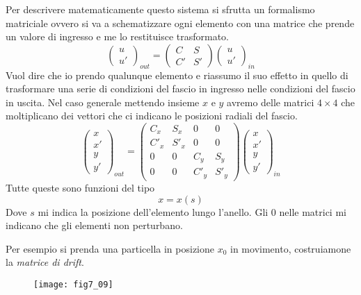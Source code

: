 Per descrivere matematicamente questo sistema si sfrutta un formalismo matriciale ovvero si va a schematizzare ogni elemento con una matrice che prende un valore di ingresso e me lo restituisce trasformato.
\begin{equation}
\begin{pmatrix}
u\\
u'
\end{pmatrix}_{out}
=
\begin{pmatrix}
C & S\\
C' & S'
\end{pmatrix}
\begin{pmatrix}
u\\
u'
\end{pmatrix}_{in}
\end{equation}
Vuol dire che io prendo qualunque elemento e riassumo il suo  effetto in quello di trasformare una serie di condizioni del fascio in ingresso nelle condizioni del fascio in uscita.
Nel caso generale mettendo insieme $x$ e $y$ avremo delle matrici $4\times 4$ che moltiplicano dei vettori che ci indicano le posizioni radiali del fascio.
\begin{equation}
\begin{pmatrix}
x\\x'\\y\\y'
\end{pmatrix}_{out}
=
\begin{pmatrix}
C_x&S_x&0&0\\C'_x&S'_x&0&0\\0&0&C_y&S_y\\0&0&C'_y&S'_y
\end{pmatrix}
\begin{pmatrix}
x\\x'\\y\\y'
\end{pmatrix}_{in}
\end{equation}
Tutte queste sono funzioni del tipo
\begin{equation}
x=x(s)
\end{equation}
Dove $s$ mi indica la posizione dell'elemento lungo l'anello.
Gli $0$ nelle matrici mi indicano che gli elementi non perturbano.

Per esempio si prenda una particella in posizione $x_0$ in movimento, costruiamone la \emph{matrice di drift}.
\begin{figure}
\centering
\texttt{[image: fig7\_09]}
\end{figure}

